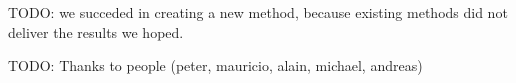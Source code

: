 TODO: we succeded in creating a new method, because existing methods did not deliver the results we hoped.


TODO: Thanks to people (peter, mauricio, alain, michael, andreas)